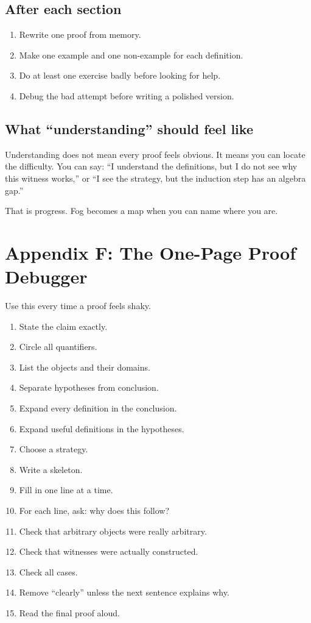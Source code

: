 \documentclass[11pt]{article}
\begin{document}
\subsection{After each section}

\begin{enumerate}
\item Rewrite one proof from memory.
\item Make one example and one non-example for each definition.
\item Do at least one exercise badly before looking for help.
\item Debug the bad attempt before writing a polished version.
\end{enumerate}

\subsection{What ``understanding'' should feel like}

Understanding does not mean every proof feels obvious. It means you can locate the difficulty. You can say: ``I understand the definitions, but I do not see why this witness works,'' or ``I see the strategy, but the induction step has an algebra gap.''

That is progress. Fog becomes a map when you can name where you are.

\newpage
\section{Appendix F: The One-Page Proof Debugger}

Use this every time a proof feels shaky.

\begin{enumerate}
\item State the claim exactly.
\item Circle all quantifiers.
\item List the objects and their domains.
\item Separate hypotheses from conclusion.
\item Expand every definition in the conclusion.
\item Expand useful definitions in the hypotheses.
\item Choose a strategy.
\item Write a skeleton.
\item Fill in one line at a time.
\item For each line, ask: why does this follow?
\item Check that arbitrary objects were really arbitrary.
\item Check that witnesses were actually constructed.
\item Check all cases.
\item Remove ``clearly'' unless the next sentence explains why.
\item Read the final proof aloud.
\end{enumerate}
\end{document}
